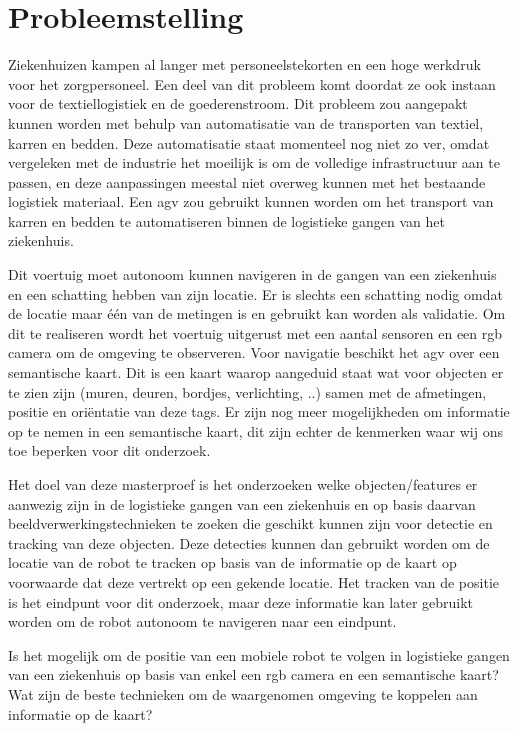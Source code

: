 
\chapter{Probleemstelling}

Ziekenhuizen kampen al langer met personeelstekorten en een hoge werkdruk voor het zorgpersoneel. Een deel van dit probleem komt doordat ze ook instaan voor de textiellogistiek en de goederenstroom.
Dit probleem zou aangepakt kunnen worden met behulp van automatisatie van de transporten van textiel, karren en bedden. Deze automatisatie staat momenteel nog niet zo ver, omdat vergeleken met de industrie het moeilijk is om de volledige
infrastructuur aan te passen, en deze aanpassingen meestal niet overweg kunnen met het bestaande logistiek materiaal. Een \gls{agv} zou gebruikt kunnen worden om het transport van karren en bedden te automatiseren binnen de logistieke gangen van het ziekenhuis.

Dit voertuig moet autonoom kunnen navigeren in de gangen van een ziekenhuis en een schatting hebben van zijn locatie.
Er is slechts een schatting nodig omdat de locatie maar \'{e}\'{e}n van de metingen is en gebruikt kan worden als validatie.
Om dit te realiseren
wordt het voertuig uitgerust met een aantal sensoren en een \gls{rgb} camera om de omgeving te observeren. Voor navigatie beschikt het \gls{agv}
over een semantische kaart.
Dit is een kaart waarop aangeduid staat wat voor objecten er te zien zijn (muren, deuren, bordjes, verlichting, ..) samen met de afmetingen, positie en ori\"{e}ntatie van deze tags.
Er zijn nog meer mogelijkheden om informatie op te nemen in een semantische kaart, dit zijn echter de kenmerken waar wij ons toe beperken voor dit onderzoek.

Het doel van deze masterproef is het onderzoeken welke objecten/features er aanwezig zijn in de logistieke gangen van een ziekenhuis en op basis daarvan
beeldverwerkingstechnieken te zoeken die geschikt kunnen zijn voor detectie en tracking van deze objecten.
Deze detecties kunnen dan gebruikt worden om de locatie van de robot te tracken op basis van de informatie op de kaart op voorwaarde dat deze vertrekt op een gekende locatie.
Het tracken van de positie is het eindpunt voor dit onderzoek, maar deze informatie kan later gebruikt worden om de robot autonoom te navigeren naar een eindpunt.

Is het mogelijk om de positie van een mobiele robot te volgen in logistieke gangen van een ziekenhuis op basis van enkel een \gls{rgb} camera en een
semantische kaart? Wat zijn de beste technieken om de waargenomen omgeving te koppelen aan informatie op de kaart?